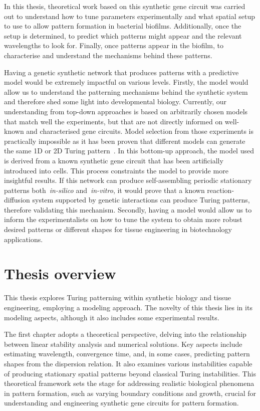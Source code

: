 In this thesis, theoretical work based on this synthetic gene circuit was carried out to understand how to tune parameters experimentally and what spatial setup to use to allow pattern formation in bacterial biofilms.
Additionally, once the setup is determined, to predict which patterns might appear and the relevant wavelengths to look for.
Finally, once patterns appear in the biofilm, to characterise and understand the mechanisms behind these patterns.

Having a genetic synthetic network that produces patterns with a predictive model would be extremely impactful on various levels.
Firstly, the model would allow us to understand the patterning mechanisms behind the synthetic system and therefore shed some light into developmental biology.
Currently, our understanding from top-down approaches is based on arbitrarily chosen models that match well the experiments, but that are not directly informed on well-known and characterised gene circuits.
Model selection from those experiments is practically impossible as it has been proven that different models can generate the same 1D or 2D Turing pattern~\parencite{Woolley2021}.
In this bottom-up approach, the model used is derived from a known synthetic gene circuit that has been artificially introduced into cells.
This process constraints the model to provide more insightful results.
If this network can produce self-assembling periodic stationary patterns both~\textit{in-silico} and~\textit{in-vitro}, it would prove that a known reaction-diffusion system supported by genetic interactions can produce Turing patterns, therefore validating this mechanism.
Secondly, having a model would allow us to inform the experimentalists on how to tune the system to obtain more robust desired patterns or different shapes for tissue engineering in biotechnology applications.


\section{Thesis overview}


This thesis explores Turing patterning within synthetic biology and tissue engineering, employing a modeling approach.
The novelty of this thesis lies in its modeling aspects, although it also includes some experimental results.

The first chapter adopts a theoretical perspective, delving into the relationship between linear stability analysis and numerical solutions.
Key aspects include estimating wavelength, convergence time, and, in some cases, predicting pattern shapes from the dispersion relation.
It also examines various instabilities capable of producing stationary spatial patterns beyond classical Turing instabilities.
This theoretical framework sets the stage for addressing realistic biological phenomena in pattern formation, such as varying boundary conditions and growth, crucial for understanding and engineering synthetic gene circuits for pattern formation.

